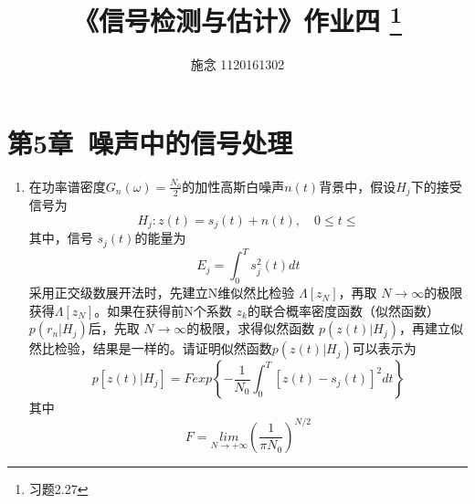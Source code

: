 \documentclass{article}
\begin{document}
\title{《信号检测与估计》作业四 \footnote{习题2.27}}
\author{施念  1120161302}
\date{}
\maketitle{}
\section{第5章\ 噪声中的信号处理}
\begin{enumerate}[1.]
\item
在功率谱密度$G_n(\omega)=\frac{N_0}{2}$的加性高斯白噪声$n(t)$背景中，假设$H_j$下的接受信号为 \[
	H_j:z(t)=s_j(t)+n(t),\quad0\le t\le 
\]
其中，信号 $ s_j(t) $的能量为 \[
	E_j=\int_0^Ts_j^2(t)dt	
\]
采用正交级数展开法时，先建立N维似然比检验 $ \Lambda[z_N] $，再取 $ N \rightarrow \infty $的极限获得$ \Lambda[z_N] $。如果在获得前N个系数 $ z_k $的联合概率密度函数（似然函数） \(p(r_n|H_j)\)后，先取 $ N \rightarrow \infty $的极限，求得似然函数 \(p(z(t)|H_j)\)，再建立似然比检验，结果是一样的。请证明似然函数\(p(z(t)|H_j)\)可以表示为\[
	p[z(t)|H_j]=Fexp\left\{-\frac{1}{N_0}\int_0^T[z(t)-s_j(t)]^2dt\right \}
\]
其中\[
	F=\underset{N \rightarrow +\infty }{lim}\left(\frac{1}{\pi N_0}\right)^{N/2}
\]



\end{enumerate}
\end{document}
